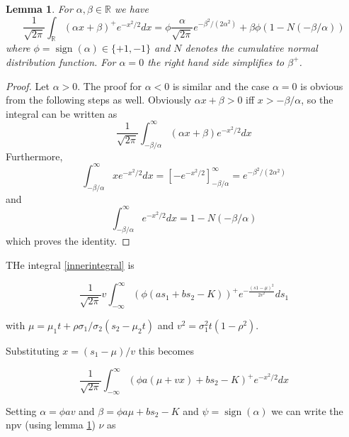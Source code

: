 \documentclass{amsart}
\theoremstyle{plain}
\newtheorem{lemma}{Lemma}
\numberwithin{equation}{section}
\DeclareMathOperator{\sign}{sign}
\begin{document}
\begin{lemma}
\label{linearnormalintegral}
For $\alpha, \beta \in \mathbb{R}$ we have
\begin{equation}
\frac{1}{\sqrt{2 \pi}} \int_{\mathbb{R}} (\alpha x+\beta)^+ e^{-x^2/2} dx = \phi \frac{\alpha}{\sqrt{2\pi}}e^{-\beta^2/(2\alpha^2)} + \beta \phi (1-N(-\beta/\alpha))
\end{equation}
where $\phi = \sign(\alpha) \in \{+1,-1\}$ and $N$ denotes the cumulative normal distribution function. For $\alpha=0$ the right hand side simplifies to $\beta^+$.
\end{lemma}
\begin{proof}
Let $\alpha>0$. The proof for $\alpha<0$ is similar and the case $\alpha=0$ is obvious from the following steps as well. Obviously $\alpha x+\beta > 0$ iff $x > -\beta/\alpha$, so the integral can be written as
\begin{equation}
\frac{1}{\sqrt{2 \pi}} \int_{-\beta/\alpha}^{\infty} (\alpha x+\beta) e^{-x^2/2} dx 
\end{equation}
Furthermore,
\begin{equation}
\int_{-\beta/\alpha}^\infty x e^{-x^2/2} dx = \left[ -e^{-x^2/2} \right]_{-\beta/\alpha}^\infty = e^{-\beta^2/(2\alpha^2)}
\end{equation}
and
\begin{equation}
\int_{-\beta/\alpha}^\infty e^{-x^2/2} dx = 1 - N(-\beta/\alpha)
\end{equation}
which proves the identity.
\end{proof}

THe integral \ref{innerintegral} is

\begin{equation}
\frac{1}{\sqrt{2\pi}} v \int_{-\infty}^\infty (\phi(as_1+bs_2-K))^+ e^{-\frac{(s1-\mu)^2}{2v^2}} ds_1
\end{equation}

with $\mu=\mu_1t+\rho\sigma_1/\sigma_2(s_2-\mu_2t)$ and $v^2=\sigma_1^2t(1-\rho^2)$.

Substituting $x=(s_1-\mu)/v$ this becomes

\begin{equation}
\frac{1}{\sqrt{2\pi}}\int_{-\infty}^{\infty} (\phi a(\mu+vx)+bs_2-K)^+ e^{-x^2/2} dx
\end{equation}

Setting $\alpha=\phi a v$ and $\beta=\phi a \mu + b s_2 - K$ and $\psi = \sign(\alpha)$ we can write the npv (using lemma \ref{linearnormalintegral}) $\nu$ as 
\end{document}
